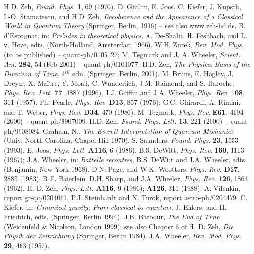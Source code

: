 \documentclass[12pt]{article}
\begin{document}
\begin{thebibliography}{99}
    H.D. Zeh, {\it Found. Phys.} {\bf 1}, 69 (1970).
    D. Giulini, E. Joos, C. Kiefer, J. Kupsch, I.-O. Stamatescu, and
H.D. Zeh, {\it Decoherence and the Appearance of a Classical World in
Quantum Theory} (Springer, Berlin, 1996) -- see also www.zeh-hd.de.
B. d'Espagnat,
in: {\it Preludes in theoretical physics}, A. De-Shalit,
H. Feshbach, and L. v. Hove, edts. (North-Holland,
Amsterdam 1966).
W.H. Zurek,
{\it Rev. Mod. Phys.} (to be published) -- quant-ph/0105127;
M. Tegmark and J. A. Wheeler, {\it Scient. Am.} {\bf 284}, 54 (Feb
2001) -- quant-ph/0101077.
    H.D. Zeh, {\em The Physical Basis of the Direction of Time},
4$^{th}$ edn. (Springer, Berlin, 2001).
M. Brune, E. Hagley, J. Dreyer, X. Ma\^itre, Y. Moali, C. Wunderlich,
J.M. Raimond, and S. Haroche, {\it Phys. Rev. Lett.} {\bf 77}, 4887
(1996).
J.J. Griffin and J.A. Wheeler, {\it Phys. Rev.} {\bf 108}, 311 (1957).
Ph. Pearle,
{\it Phys. Rev.} {\bf D13}, 857 (1976); G.C. Ghirardi,
A. Rimini, and T. Weber,
{\it Phys. Rev.} {\bf D34}, 470 (1986).
	  M. Tegmark, {\it Phys. Rev.} {\bf E61}, 4194 (2000) --
quant-ph/9907009.
H.D. Zeh,
{\it Found. Phys. Lett.} {\bf 13}, 221 (2000) -- quant-ph/9908084.
Graham, N., {\it The Everett Interpretation of Quantum
Mechanics}  (Univ. North Carolina, Chapel Hill 1970).
S. Saunders, {\it Found. Phys.} {\bf 23}, 1553 (1993).
E. Joos,
{\it Phys. Lett.}  {\bf A116}, 6 (1986).
B.S. DeWitt, {\it Phys. Rev.} {\bf 160}, 1113 (1967); J.A. Wheeler, in:
{\it Battelle recontres}, B.S. DeWitt and J.A. Wheeler, edts.
(Benjamin, New York 1968).
D.N. Page, and W.K. Wootters, %
{\it Phys. Rev.} {\bf D27}, 2885 (1983).
R.F. Baierlein, D.H. Sharp, and J.A. Wheeler,
{\it Phys. Rev.} {\bf 126}, 1864 (1962).
H. D. Zeh, {\it Phys. Lett.} {\bf A116}, 9 (1986); {\bf A126}, 311
(1988).
A. Vilenkin, report gr-qc/0204061.
P.J. Steinhardt and N. Turok, report astro-ph/0204479.
C. Kiefer,
in: {\it Canonical gravity: From classical to quantum},
J. Ehlers, and H. Friedrich, edts. (Springer, Berlin 1994).
J.B. Barbour, {\it The End of Time} (Weidenfeld \&
Nicolson, London 1999); see also Chapter 6 of H. D. Zeh, {\it Die
Physik der Zeitrichtung} (Springer, Berlin 1984).
J.A. Wheeler, {\it Rev. Mod. Phys.} {\bf 29}, 463 (1957).
\end{thebibliography}


 
\end{document}
